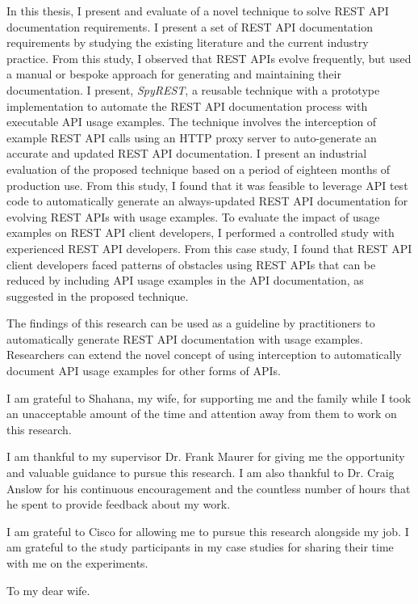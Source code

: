 \documentclass[12pt]{ucalgthes1}
\begin{document}
In this thesis, I present and evaluate of a novel technique to solve REST API documentation requirements. I present a set of REST API documentation requirements by studying the existing literature and the current industry practice. From this study, I observed that REST APIs evolve frequently, but used a manual or bespoke approach for generating and maintaining their documentation. I present, \textit{SpyREST}, a reusable technique with a prototype implementation to automate the REST API documentation process with executable API usage examples. The technique involves the interception of example REST API calls using an HTTP proxy server to auto-generate an accurate and updated REST API documentation. I present an industrial evaluation of the proposed technique based on a period of eighteen months of production use. From this study, I found that it was feasible to leverage API test code to automatically generate an always-updated REST API documentation for evolving REST APIs with usage examples. To evaluate the impact of usage examples on REST API client developers, I performed a controlled study with experienced REST API developers. From this case study, I found that REST API client developers faced patterns of obstacles using REST APIs that can be reduced by including API usage examples in the API documentation, as suggested in the proposed technique.

The findings of this research can be used as a guideline by practitioners to automatically generate REST API documentation with usage examples. Researchers can extend the novel concept of using interception to automatically document API usage examples for other forms of APIs.

\newpage
{}
{}
\begin{singlespace}
I am grateful to Shahana, my wife, for supporting me and the family while I took an unacceptable amount of the time and attention away from them to work on this research.

I am thankful to my supervisor Dr. Frank Maurer for giving me the opportunity and valuable guidance to pursue this research. I am also thankful to Dr. Craig Anslow for his continuous encouragement and the countless number of hours that he spent to provide feedback about my work.

I am grateful to Cisco for allowing me to pursue this research alongside my job. I am grateful to the study participants in my case studies for sharing their time with me on the experiments.
\newpage
{}
{}
\begin{center}
  To my dear wife.
\end{center}
\newpage
{}
\tableofcontents
\pagestyle{plain}
\newpage
{}
\listoftables
\pagestyle{plain}
\newpage
{}
\listoffigures
\pagestyle{plain}
\clearpage
\clearpage          %
\end{singlespace}
\newpage
{}
\end{document}
